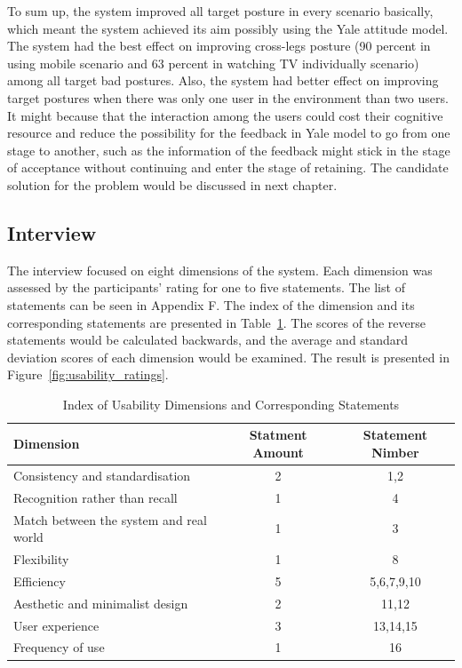 To sum up, the system improved all target posture in every scenario basically, which meant the system achieved its aim possibly using the Yale attitude model. The system had the best effect on improving cross-legs posture (90 percent in using mobile scenario and 63 percent in watching TV individually scenario) among all target bad postures. Also, the system had better effect on improving target postures when there was only one user in the environment than two users. It might because that the interaction among the users could cost their cognitive resource and reduce the possibility for the feedback in Yale model to go from one stage to another, such as the information of the feedback might stick in the stage of acceptance without continuing and enter the stage of retaining. The candidate solution for the problem would be discussed in next chapter.

\subsection{Interview}
The interview focused on eight dimensions of the system. Each dimension was assessed by the participants’ rating for one to five statements. The list of statements can be seen in Appendix F. The index of the dimension and its corresponding statements are presented in Table~\ref{tab:nonlin}. The scores of the reverse statements would be calculated backwards, and the average and standard deviation scores of each dimension would be examined. The result is presented in Figure~\ref{fig:usability_ratings}.

\begin{table}[ht]
\centering
\begin{tabular}{l c c}
Dimension&Statment Amount&Statement Nimber\\
\hline
Consistency and standardisation&2&1,2\\
Recognition rather than recall&1&4\\
Match between the system and real world&1&3\\ 
Flexibility&1&8\\
Efficiency&5&5,6,7,9,10\\ 
Aesthetic and minimalist design&2&11,12 \\
User experience&3&13,14,15\\
Frequency of use&1&16\\
[1ex]
\hline
\end{tabular}
\caption{Index of Usability Dimensions and Corresponding Statements}
\label{tab:nonlin}
\end{table}

